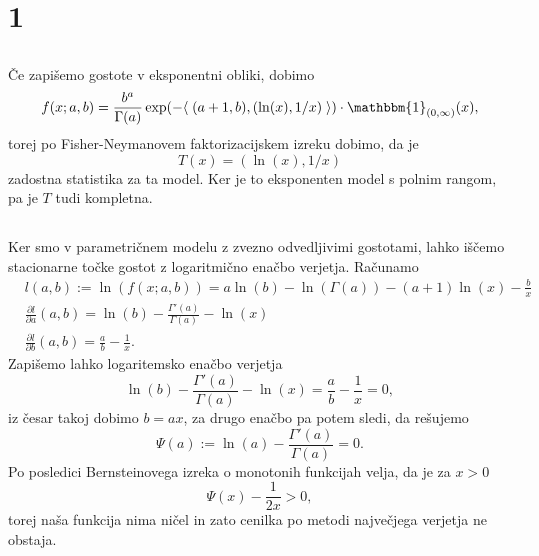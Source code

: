 \documentclass[ letterpaper, titlepage, fleqn]{article}
\newcommand{\scalar}[1]{\langle\;#1\;\rangle}
\newcommand{\ind}{\mathbbm{1}}
\begin{document}
\section{1}

\subsection{}
Če zapišemo gostote v eksponentni obliki, dobimo
$$f(x; a,b) = \frac{b^a}{\Gamma(a)} \exp(-\scalar{(a+1, b), (\ln(x), 1/x)}) \cdot \ind_{(0,\infty)}(x),$$
torej po Fisher-Neymanovem faktorizacijskem izreku dobimo, da je
$$T(x) = (\ln(x), 1/x)$$
zadostna statistika za ta model. Ker je to eksponenten model s polnim rangom, pa je $T$ tudi kompletna.

\subsection{}
Ker smo v parametričnem modelu z zvezno odvedljivimi gostotami, lahko iščemo stacionarne točke gostot 
z logaritmično enačbo verjetja. Računamo
\begin{equation*}
\begin{aligned}
&l(a,b) := \ln(f(x; a,b)) = a\ln(b) - \ln(\Gamma(a)) - (a+1)\ln(x) - \frac{b}{x} \\
&\frac{\partial l}{\partial a}(a,b) = \ln(b) - \frac{\Gamma'(a)}{\Gamma(a)} - \ln(x) \\
&\frac{\partial l}{\partial b}(a,b) = \frac{a}{b} - \frac{1}{x}.
\end{aligned}
\end{equation*}
Zapišemo lahko logaritemsko enačbo verjetja
$$\ln(b) - \frac{\Gamma'(a)}{\Gamma(a)} - \ln(x) = \frac{a}{b} - \frac{1}{x} = 0,$$
iz česar takoj dobimo $b = ax$, za drugo enačbo pa potem sledi, da rešujemo
$$\Psi(a) := \ln(a) - \frac{\Gamma'(a)}{\Gamma(a)} = 0.$$
Po posledici Bernsteinovega izreka o monotonih funkcijah velja, da je za $x > 0$
$$\Psi(x) - \frac{1}{2x} > 0,$$
torej naša funkcija nima ničel in zato cenilka po metodi največjega verjetja ne obstaja.
\end{document}
